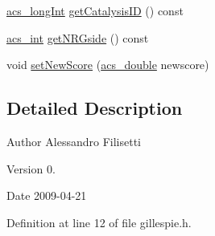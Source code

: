 \begin{DoxyCompactItemize}
\item 
\hyperlink{a00050_a19319d75f02db4308bc5c0026d98cd85}{acs\-\_\-long\-Int} \hyperlink{a00015_a0f2202c3d3662ce7cec6b127f066f715}{get\-Catalysis\-I\-D} () const 
\item 
\hyperlink{a00050_a8d277355641a098190360234e2ebde35}{acs\-\_\-int} \hyperlink{a00015_ad668afc14941b6842c703046a1a2d4c1}{get\-N\-R\-Gside} () const 
\item 
void \hyperlink{a00015_a43ac16698f9e047c7384b4219f9e5e86}{set\-New\-Score} (\hyperlink{a00050_ab776853a005fcbf56af0424a2a4dd607}{acs\-\_\-double} newscore)
\end{DoxyCompactItemize}


\subsection{Detailed Description}
\begin{DoxyAuthor}{Author}
Alessandro Filisetti 
\end{DoxyAuthor}
\begin{DoxyVersion}{Version}
0. 
\end{DoxyVersion}
\begin{DoxyDate}{Date}
2009-\/04-\/21 
\end{DoxyDate}


Definition at line 12 of file gillespie.\-h.



